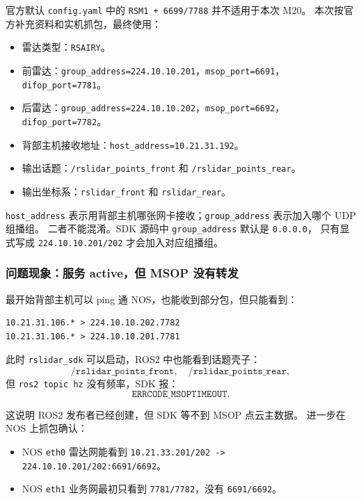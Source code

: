 \documentclass[UTF8,11pt,a4paper]{ctexart}
\begin{document}
官方默认 \texttt{config.yaml} 中的 \texttt{RSM1 + 6699/7788} 并不适用于本次 M20。
本次按官方补充资料和实机抓包，最终使用：

\begin{itemize}
  \item 雷达类型：\texttt{RSAIRY}。
  \item 前雷达：\texttt{group\_address=224.10.10.201}，\texttt{msop\_port=6691}，\texttt{difop\_port=7781}。
  \item 后雷达：\texttt{group\_address=224.10.10.202}，\texttt{msop\_port=6692}，\texttt{difop\_port=7782}。
  \item 背部主机接收地址：\texttt{host\_address=10.21.31.192}。
  \item 输出话题：\texttt{/rslidar\_points\_front} 和 \texttt{/rslidar\_points\_rear}。
  \item 输出坐标系：\texttt{rslidar\_front} 和 \texttt{rslidar\_rear}。
\end{itemize}

\texttt{host\_address} 表示用背部主机哪张网卡接收；\texttt{group\_address} 表示加入哪个 UDP 组播组。
二者不能混淆。SDK 源码中 \texttt{group\_address} 默认是 \texttt{0.0.0.0}，
只有显式写成 \texttt{224.10.10.201/202} 才会加入对应组播组。

\subsubsection{问题现象：服务 active，但 MSOP 没有转发}

最开始背部主机可以 ping 通 NOS，也能收到部分包，但只能看到：

\begin{verbatim}
10.21.31.106.* > 224.10.10.202.7782
10.21.31.106.* > 224.10.10.201.7781
\end{verbatim}

此时 \texttt{rslidar\_sdk} 可以启动，ROS2 中也能看到话题壳子：
\[
\texttt{/rslidar\_points\_front},\quad \texttt{/rslidar\_points\_rear},
\]
但 \texttt{ros2 topic hz} 没有频率，SDK 报：
\[
\texttt{ERRCODE\_MSOPTIMEOUT}.
\]

这说明 ROS2 发布者已经创建，但 SDK 等不到 MSOP 点云主数据。
进一步在 NOS 上抓包确认：

\begin{itemize}
  \item NOS \texttt{eth0} 雷达网能看到 \texttt{10.21.33.201/202 -> 224.10.10.201/202:6691/6692}。
  \item NOS \texttt{eth1} 业务网最初只看到 \texttt{7781/7782}，没有 \texttt{6691/6692}。
\end{itemize}
\end{document}
